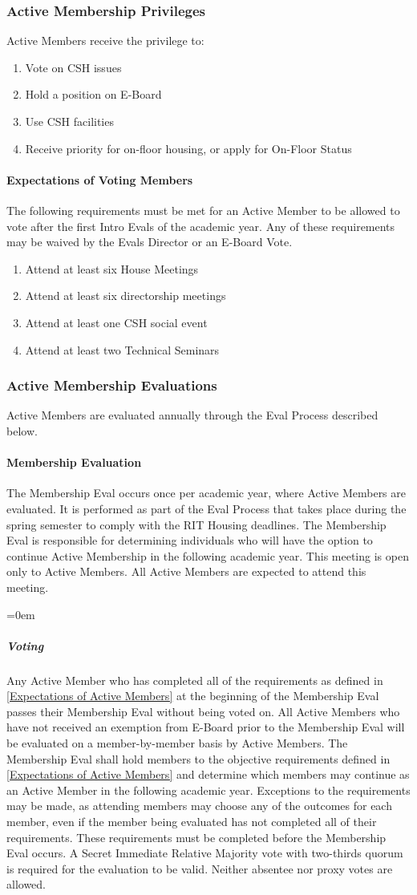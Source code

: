 \documentclass{article}
\newcommand{\asubsection}[1]{\subsubsection{#1} \label{#1}}
\newcommand{\asubsubsection}[1]{\paragraph{#1} \label{#1}}
\newcommand{\asubsubsubsection}[1]{\parindent=0em\subparagraph{#1} \label{#1}}
\begin{document}
\asubsection{Active Membership Privileges}
Active Members receive the privilege to:
\begin{enumerate}
	\item Vote on CSH issues
	\item Hold a position on E-Board
	\item Use CSH facilities
	\item Receive priority for on-floor housing, or apply for On-Floor Status
\end{enumerate}

\asubsubsection{Expectations of Voting Members}
\renewcommand{\theenumi}{\arabic{enumi}} %

The following requirements must be met for an Active Member to be allowed to vote after the first Intro Evals of the academic year.
Any of these requirements may be waived by the Evals Director or an E-Board Vote.
\begin{enumerate}
	\item Attend at least six House Meetings
	\item Attend at least six directorship meetings
	\item Attend at least one CSH social event
	\item Attend at least two Technical Seminars
\end{enumerate}

\asubsection{Active Membership Evaluations}
Active Members are evaluated annually through the Eval Process described below.

\asubsubsection{Membership Evaluation}
The Membership Eval occurs once per academic year, where Active Members are evaluated.
It is performed as part of the Eval Process that takes place during the spring semester to comply with the RIT Housing deadlines.
The Membership Eval is responsible for determining individuals who will have the option to continue Active Membership in the following academic year.
This meeting is open only to Active Members.
All Active Members are expected to attend this meeting.

\asubsubsubsection{Voting}
Any Active Member who has completed all of the requirements as defined in \ref{Expectations of Active Members} at the beginning of the Membership Eval passes their Membership Eval without being voted on.
All Active Members who have not received an exemption from E-Board prior to the Membership Eval will be evaluated on a member-by-member basis by Active Members.
The Membership Eval shall hold members to the objective requirements defined in \ref{Expectations of Active Members} and determine which members may continue as an Active Member in the following academic year.
Exceptions to the requirements may be made, as attending members may choose any of the outcomes for each member, even if the member being evaluated has not completed all of their requirements.
These requirements must be completed before the Membership Eval occurs.
A Secret Immediate Relative Majority vote with two-thirds quorum is required for the evaluation to be valid.
Neither absentee nor proxy votes are allowed.
\end{document}
